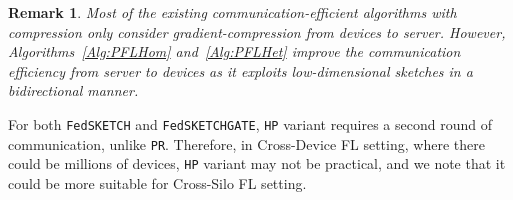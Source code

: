 \documentclass[sigconf, anonymous, review]{acmart}
\newcommand\DrawBox[3][]{%
  \begin{tikzpicture}[remember picture,overlay]
    \draw[overlay,fill=gray!30,#1] 
    ([xshift=9em,yshift=-0.4ex]{pic cs:#2}) 
    rectangle 
    ([xshift=-4pt,yshift=1.1ex]pic cs:#3);
  \end{tikzpicture}%
}
\newcommand\DrawBoxx[3][]{%
  \begin{tikzpicture}[remember picture,overlay]
    \draw[overlay,fill=gray!30,#1] 
    ([xshift=-6.0em,yshift=-1.0ex]{pic cs:#2}) 
    rectangle 
    ([xshift=60pt,yshift=-1.2ex]pic cs:#3);
  \end{tikzpicture}%
}
\newtheorem{remark}{Remark}
\begin{document}
\begin{remark}\label{rmk:bidirect}
Most of the existing communication-efficient algorithms with compression only consider gradient-compression from devices to server. 
However, Algorithms~\ref{Alg:PFLHom} and~\ref{Alg:PFLHet} improve the communication efficiency from server to devices as it exploits low-dimensional sketches in a bidirectional manner. 
\end{remark}
For both \texttt{FedSKETCH} and \texttt{FedSKETCHGATE}, \texttt{HP} variant requires a second round of communication, unlike \texttt{PR}. 
Therefore, in Cross-Device FL setting, where there could be millions of devices, \texttt{HP} variant may not be practical, and we note that it could be more suitable for Cross-Silo FL setting. 
\end{document}

